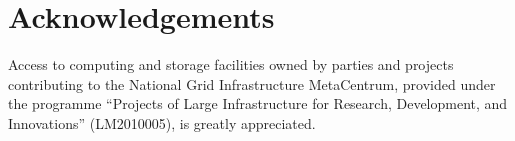 

\section{Acknowledgements}

Access to computing and storage facilities owned by parties and projects contributing to the National Grid Infrastructure MetaCentrum, provided under the programme ``Projects of Large Infrastructure for Research, Development, and Innovations'' (LM2010005), is greatly appreciated.